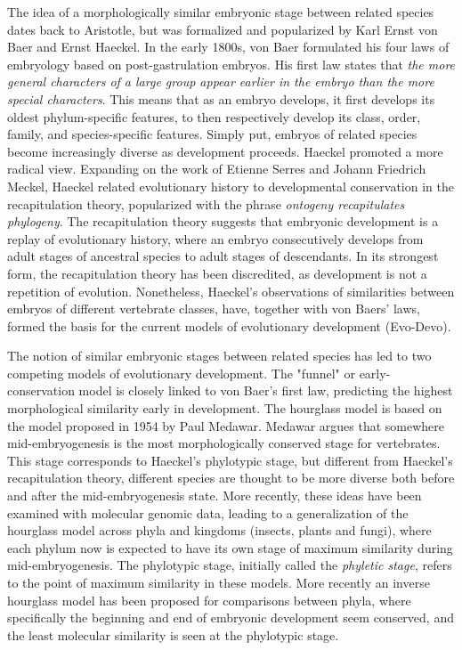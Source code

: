The idea of a morphologically similar embryonic stage between related species dates back to Aristotle\cite{Aristotle1943}, but was formalized and popularized by Karl Ernst von Baer and Ernst Haeckel\cite{haeckel1866,baer1828}. In the early 1800s, von Baer formulated his four laws of embryology based on post-gastrulation embryos. His first law states that \textit{the more general characters of a large group appear earlier in the embryo than the more special characters}. This means that as an embryo develops, it first develops its oldest phylum-specific features, to then respectively develop its class, order, family, and species-specific features. Simply put, embryos of related species become increasingly diverse as development proceeds. Haeckel promoted a more radical view. Expanding on the work of Etienne Serres and Johann Friedrich Meckel, Haeckel related evolutionary history to developmental conservation in the recapitulation theory, popularized with the phrase \textit{ontogeny recapitulates phylogeny}. The recapitulation theory suggests that embryonic development is a replay of evolutionary history, where an embryo consecutively develops from adult stages of ancestral species to adult stages of descendants. In its strongest form, the recapitulation theory has been discredited, as development is not a repetition of evolution\cite{ehrlich1974}. Nonetheless, Haeckel's observations of similarities between embryos of different vertebrate classes, have, together with von Baers’ laws, formed the basis for the current models of evolutionary development (Evo-Devo).

The notion of similar embryonic stages between related species has led to two competing models of evolutionary development. The "funnel" or early-conservation model is closely linked to von Baer's first law, predicting the highest morphological similarity early in development. The hourglass model is based on the model proposed in 1954 by Paul Medawar\cite{Medawar1954}. Medawar argues that somewhere mid-embryogenesis is the most morphologically conserved stage for vertebrates. This stage corresponds to Haeckel's phylotypic stage, but different from Haeckel's recapitulation theory, different species are thought to be more diverse both before and after the mid-embryogenesis state. More recently, these ideas have been examined with molecular genomic data, leading to a generalization of the hourglass model across phyla and kingdoms (insects\cite{Kalinka2010}, plants\cite{Quint2012} and fungi\cite{Cheng2015}), where each phylum now is expected to have its own stage of maximum similarity during mid-embryogenesis. The phylotypic stage, initially called the \textit{phyletic stage}, refers to the point of maximum similarity in these models\cite{Cohen1963, Seidel1960}. More recently an inverse hourglass model has been proposed for comparisons between phyla, where specifically the beginning and end of embryonic development seem conserved, and the least molecular similarity is seen at the phylotypic stage\cite{Levin2016}.

